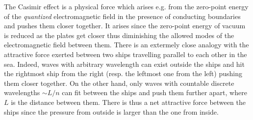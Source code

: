 \documentclass[../QFT_main.tex]{subfiles}
\begin{document}
\begin{mytheorem}
%
The Casimir effect is a physical force which arises e.g. from the zero-point energy of the \emph{quantized} electromagnetic field in the presence of conducting boundaries and pushes them closer together.
It arises since the zero-point energy of vacuum is reduced as the plates get closer thus diminishing the allowed modes of the electromagnetic field between them.
There is an extermely close analogy with the attractive force exerted between two ships travelling parallel to each other in the sea.
Indeed, waves with arbitrary wavelength can exist outside the ships and hit the rightmost ship from the right (resp. the leftmost one from the left) pushing them closer together.
On the other hand, only waves with countable discrete wavelengths $\sim L/n$ can fit between the ships and push them further apart, where $L$ is the distance between them.
There is thus a net attractive force between the ships since the pressure from outside is larger than the one from inside.


\end{mytheorem}
\end{document}
